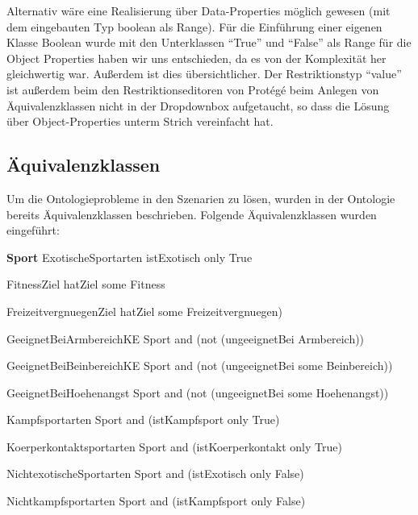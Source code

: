 Alternativ wäre eine Realisierung über Data-Properties möglich gewesen (mit dem eingebauten Typ boolean als Range). Für die Einführung einer eigenen Klasse Boolean wurde mit den Unterklassen "`True"' und "`False"' als Range für die Object Properties haben wir uns entschieden, da es von der Komplexität her gleichwertig war. Außerdem ist dies übersichtlicher. Der Restriktionstyp "`value"' ist außerdem beim den Restriktionseditoren von Protégé beim Anlegen von Äquivalenzklassen nicht in der Dropdownbox aufgetaucht, so dass die Lösung über Object-Properties unterm Strich vereinfacht hat.


\subsection{Äquivalenzklassen}

Um die Ontologieprobleme in den Szenarien zu lösen, wurden in der Ontologie bereits Äquivalenzklassen beschrieben. Folgende Äquivalenzklassen wurden eingeführt:


\textbf{Sport}
ExotischeSportarten  
	istExotisch only True
	
FitnessZiel
	hatZiel some Fitness
	
FreizeitvergnuegenZiel
	hatZiel some  Freizeitvergnuegen)
	
GeeignetBeiArmbereichKE
	Sport and (not (ungeeignetBei Armbereich))
	
GeeignetBeiBeinbereichKE
	Sport and (not (ungeeignetBei some Beinbereich))
	
GeeignetBeiHoehenangst
	Sport and (not (ungeeignetBei some Hoehenangst))
	
Kampfsportarten 
	Sport and (istKampfsport only True)
	
Koerperkontaktsportarten 
	Sport and (istKoerperkontakt only True)
	
NichtexotischeSportarten 
	Sport and (istExotisch only False)
	
Nichtkampfsportarten 
	Sport and (istKampfsport only False)
	

